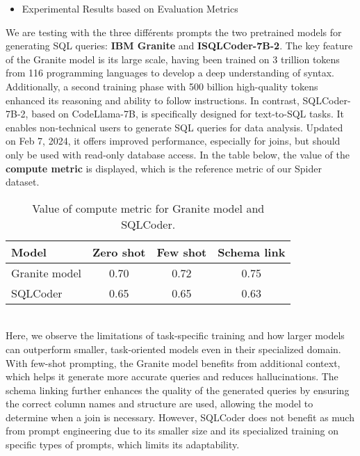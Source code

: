 \documentclass[12pt,a4paper]{article}
\begin{document}
  \begin{itemize}
  \item Experimental Results based on Evaluation Metrics
  \end{itemize}
  We are testing with the three différents prompts the two pretrained models for generating SQL queries: \textbf{IBM Granite} and \textbf{ISQLCoder-7B-2}.
The key feature of the Granite model is its large scale, having been trained on 3 trillion tokens from 116 programming languages to develop a deep understanding of syntax. Additionally, a second training phase with 500 billion high-quality tokens enhanced its reasoning and ability to follow instructions.
In contrast, SQLCoder-7B-2, based on CodeLlama-7B, is specifically designed for text-to-SQL tasks. It enables non-technical users to generate SQL queries for data analysis. Updated on Feb 7, 2024, it offers improved performance, especially for joins, but should only be used with read-only database access. In the table below, the value of the \textbf{compute metric} is displayed, which is the reference metric of our Spider dataset.\\

\begin{table}[h]
    \centering
    \small
    \begin{tabular}{|l|c|c|c|}
        \hline
        \textbf{Model} & \textbf{Zero shot} & \textbf{Few shot} & \textbf{Schema link} \\ \hline
        Granite model & 0.70 & 0.72 & 0.75 \\ \hline
        SQLCoder    & 0.65 & 0.65 & 0.63 \\ \hline
    \end{tabular}
    \caption{Value of compute metric for Granite model and SQLCoder.}
    \label{tab:evaluation_metrics}
\end{table}\\


Here, we observe the limitations of task-specific training and how larger models can outperform smaller, task-oriented models even in their specialized domain.
With few-shot prompting, the Granite model benefits from additional context, which helps it generate more accurate queries and reduces hallucinations. The schema linking further enhances the quality of the generated queries by ensuring the correct column names and structure are used, allowing the model to determine when a join is necessary.
However, SQLCoder does not benefit as much from prompt engineering due to its smaller size and its specialized training on specific types of prompts, which limits its adaptability.
\end{document}
